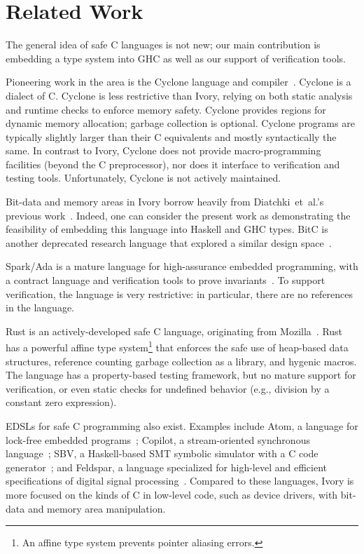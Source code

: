 \section{Related Work}
\label{sec:related-work}

The general idea of safe C languages is not new; our main contribution is
embedding a type system into GHC as well as our support of verification
tools.

Pioneering work in the area is the Cyclone language and
compiler~\cite{cyclone}. Cyclone is a dialect of C. Cyclone is less restrictive than
Ivory, relying on both static analysis and runtime checks to enforce memory
safety. Cyclone provides regions for dynamic memory allocation; garbage
collection is optional. Cyclone programs are typically slightly larger than
their C equivalents and mostly syntactically the same. In contrast to Ivory,
Cyclone does not provide macro-programming facilities (beyond the C
preprocessor), nor does it interface to verification and testing
tools. Unfortunately, Cyclone is not actively maintained.

Bit-data and memory areas in Ivory borrow heavily from Diatchki~et~al.'s
previous work~\cite{high-level, memareas}. Indeed, one can consider the present
work as demonstrating the feasibility of embedding this language into Haskell
and GHC types. BitC is another deprecated research language that explored a
similar design space~\cite{bitc}.

Spark/Ada is a mature language for high-assurance embedded
programming, with a contract language and verification tools to
prove invariants~\cite{spark}. To support verification, the language is
very restrictive: in particular, there are no references in the language.

Rust is an actively-developed safe C language, originating from
Mozilla~\cite{rust}. Rust has a powerful affine type system\footnote{An affine
type system prevents pointer aliasing errors.} that enforces the safe use of
heap-based data structures, reference counting garbage collection as a library,
and hygenic macros. The language has a property-based testing framework, but no
mature support for verification, or even static checks for undefined behavior
(e.g., division by a constant zero expression).

EDSLs for safe C programming also exist. Examples include Atom, a language for
lock-free embedded programs~\cite{atom}; Copilot, a stream-oriented synchronous
language~\cite{copilot}; SBV, a Haskell-based SMT symbolic simulator with a C code
generator~\cite{sbv}; and Feldspar, a language specialized for high-level and
efficient specifications of digital signal processing~\cite{feldspar1}. Compared to these
languages, Ivory is more focused on the kinds of C in low-level code, such as
device drivers, with bit-data and memory area manipulation.
